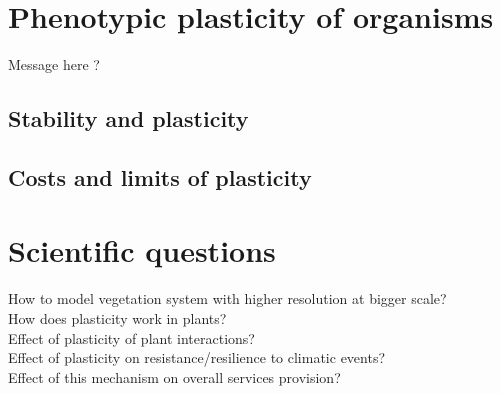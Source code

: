 \chapter{Phenotypic plasticity of organisms}
Message here ?

\section{Stability and plasticity}

\section{Costs and limits of plasticity}


\chapter*{Scientific questions}
How to model vegetation system with higher resolution at bigger scale?\\
How does plasticity work in plants?\\
Effect of plasticity of plant interactions?\\
Effect of plasticity on resistance/resilience to climatic events?\\
Effect of this mechanism on overall services provision?




